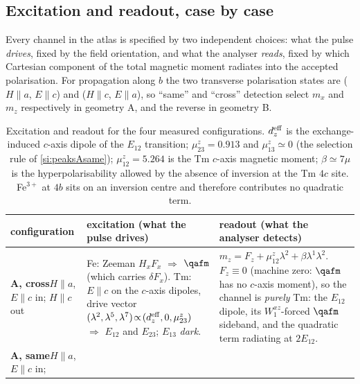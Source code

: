 \subsection{Excitation and readout, case by case}
\label{si:whatsees}

Every channel in the atlas is specified by two independent choices: what
the pulse \emph{drives}, fixed by the field orientation, and what the
analyser \emph{reads}, fixed by which Cartesian component of the total
magnetic moment radiates into the accepted polarisation.  For
propagation along $b$ the two transverse polarisation states are
($H\!\parallel\!a$, $E\!\parallel\!c$) and ($H\!\parallel\!c$,
$E\!\parallel\!a$), so ``same'' and ``cross'' detection select $m_x$ and
$m_z$ respectively in geometry A, and the reverse in geometry B.

\begin{table}[h]
\centering\small
\caption{Excitation and readout for the four measured configurations.
$d_z^{\rm eff}$ is the exchange-induced $c$-axis dipole of the $E_{12}$
transition; $\mu^z_{23}=0.913$ and $\mu^z_{13}\simeq0$ (the selection
rule of \cref{si:peaksAsame}); $\mu^z_{12}=5.264$ is the Tm $c$-axis
magnetic moment; $\beta\simeq7\mu$ is the hyperpolarisability allowed by
the absence of inversion at the Tm $4c$ site.  Fe$^{3+}$ at $4b$ sits on
an inversion centre and therefore contributes no quadratic term.}
\label{tab:si-channels}
\renewcommand{\arraystretch}{1.35}
\begin{tabular}{p{2.1cm}p{5.2cm}p{7.4cm}}
\toprule
configuration & excitation (what the pulse drives) & readout (what the
analyser detects)\\
\midrule
\textbf{A, cross}\newline $H\!\parallel\!a$, $E\!\parallel\!c$ in;
$H\!\parallel\!c$ out
& Fe: Zeeman $H_x F_x$ $\Rightarrow$ $\qafm$ (which carries
  $\delta F_x$).\newline
  Tm: $E\!\parallel\!c$ on the $c$-axis dipoles, drive vector
  $(\lambda^2,\lambda^5,\lambda^7)\!\propto\!(d_z^{\rm eff},0,\mu^z_{23})$
  $\Rightarrow$ $E_{12}$ and $E_{23}$; $E_{13}$ \emph{dark}.
& $m_z=F_z+\mu^z_{12}\lambda^2+\beta\lambda^1\lambda^2$.\newline
  $F_z\equiv0$ (machine zero: $\qafm$ has no $c$-axis moment), so the
  channel is \emph{purely} Tm: the $E_{12}$ dipole, its $W^{xz}_1$-forced
  $\qafm$ sideband, and the quadratic term radiating at $2E_{12}$.\\
\textbf{A, same}\newline $H\!\parallel\!a$, $E\!\parallel\!c$ in;

\end{tabular}
\end{table}
